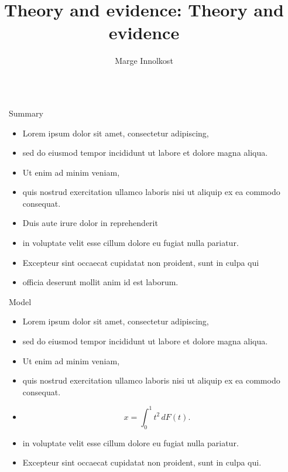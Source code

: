 \documentclass[12pt, final]{beamer}
\title{Theory and evidence: Theory and evidence}
\author{Marge Innolkost}
\newlength{\sepwid}
\newlength{\onecolwid}
\begin{document}
\begin{frame}[t]
  \begin{columns}[t]
    \begin{column}{\sepwid}\end{column} %
    \begin{column}{\onecolwid}
      \begin{block}{Summary}
        \begin{itemize}
          \item Lorem ipsum \alert{dolor} sit amet, consectetur adipiscing,
          \item sed do eiusmod tempor incididunt ut labore et dolore magna aliqua.
          \item Ut enim ad minim veniam,
          \item quis nostrud exercitation ullamco laboris nisi ut aliquip ex ea commodo consequat.
          \item Duis aute irure dolor in reprehenderit
          \item in voluptate velit \alert{esse cillum dolore} eu fugiat nulla pariatur.
          \item Excepteur sint occaecat cupidatat non proident, sunt in culpa qui
          \item officia deserunt mollit anim id est laborum.
        \end{itemize}
      \end{block}
      \begin{block}{Model}
        \begin{itemize}
          \item Lorem ipsum \alert{dolor} sit amet, consectetur adipiscing,
          \item sed do eiusmod tempor incididunt ut labore et dolore magna aliqua.
          \item Ut enim ad minim veniam,
          \item quis nostrud exercitation ullamco laboris nisi ut aliquip ex ea commodo consequat.
          \item $$x = \int_0^1 t^2 \,dF(t).$$
          \item in voluptate velit \alert{esse cillum dolore} eu fugiat nulla pariatur.
          \item Excepteur sint occaecat cupidatat non proident, sunt in culpa qui.
        \end{itemize}
      \end{block}

\end{column}
\end{columns}
\end{frame}
\end{document}
